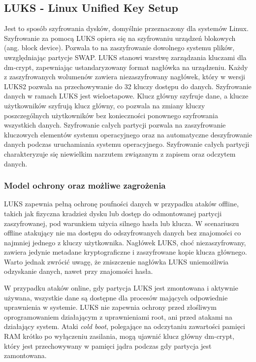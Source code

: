 \documentclass[a4paper]{article}
\begin{document}
\subsection{LUKS - Linux Unified Key Setup}
Jest to sposób szyfrowania dysków, domyślnie przeznaczony dla systemów Linux. Szyfrowanie
za pomocą LUKS opiera się na szyfrowaniu urządzeń blokowych (ang. block device). Pozwala to
na zaszyfrowanie dowolnego systemu plików, uwzględniając partycje SWAP. LUKS stanowi warstwę
zarządzania kluczami dla dm-crypt, zapewniając ustandaryzowany format nagłówka na urządzeniu.
Każdy z zaszyfrowanych wolumenów zawiera niezaszyfrowany nagłówek, który w wersji LUKS2
pozwala na przechowywanie do 32 kluczy dostępu do danych. Szyfrowanie danych w ramach LUKS
jest wieloetapowe. Klucz główny szyfruje dane, a klucze użytkowników szyfrują klucz główny,
co pozwala na zmiany kluczy poszczególnych użytkowników bez konieczności ponownego szyfrowania
wszystkich danych. Szyfrowanie całych partycji pozwala na zaszyfrowanie kluczowych elementów
systemu operacyjnego oraz na automatyczne deszyfrowanie danych podczas uruchamiania systemu
operacyjnego. Szyfrowanie całych partycji charakteryzuje się niewielkim narzutem związanym
z zapisem oraz odczytem danych.

\subsubsection{Model ochrony oraz możliwe zagrożenia}
LUKS zapewnia pełną ochronę poufności danych w przypadku ataków offline, takich jak fizyczna
kradzież dysku lub dostęp do odmontowanej partycji zaszyfrowanej, pod warunkiem użycia silnego
hasła lub klucza. W scenariuszu offline atakujący nie ma dostępu do odszyfrowanych danych bez
znajomości co najmniej jednego z kluczy użytkownika. Nagłówek LUKS, choć niezaszyfrowany,
zawiera jedynie metadane kryptograficzne i zaszyfrowane kopie klucza głównego.
Warto jednak zwrócić uwagę, że zniszczenie nagłówka LUKS uniemożliwia odzyskanie danych,
nawet przy znajomości hasła.

W przypadku ataków online, gdy partycja LUKS jest zmontowana i aktywnie używana, wszystkie
dane są dostępne dla procesów mających odpowiednie uprawnienia w systemie. LUKS nie zapewnia
ochrony przed złośliwym oprogramowaniem działającym z uprawnieniami root, ani przed atakami
na działający system. Ataki \textit{cold boot}, polegające na odczytaniu zawartości pamięci
RAM krótko po wyłączeniu zasilania, mogą ujawnić klucz główny dm-crypt, który jest przechowywany
w pamięci jądra podczas gdy partycja jest zamontowana.
\end{document}
